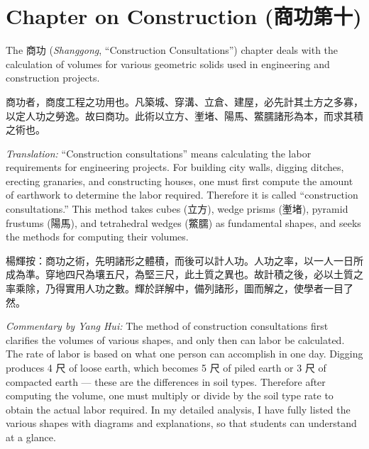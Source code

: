 \documentclass[11pt,a4paper]{article}
\newcommand{\zh}[1]{{#1}}
\newenvironment{chpassage}{%
  \par\medskip
  \begin{center}
  \begin{minipage}{0.95\textwidth}
  \setlength{\parindent}{2em}
  \linespread{1.3}\selectfont
}{%
  \end{minipage}
  \end{center}
  \medskip
}
\begin{document}
\newpage

\section{Chapter on Construction (\zh{商功第十})}
\label{sec:shanggong}

The \zh{商功} (\textit{Shanggong}, ``Construction Consultations'') chapter
deals with the calculation of volumes for various geometric solids used in
engineering and construction projects.

\begin{chpassage}
\zh{商功者，商度工程之功用也。凡築城、穿溝、立倉、建屋，必先計其土方之多寡，以定人功之勞逸。故曰商功。此術以立方、壍堵、陽馬、鱉臑諸形為本，而求其積之術也。}

\medskip
\textit{Translation:} ``Construction consultations'' means calculating the
labor requirements for engineering projects. For building city walls,
digging ditches, erecting granaries, and constructing houses, one must first
compute the amount of earthwork to determine the labor required. Therefore it
is called ``construction consultations.'' This method takes cubes (\zh{立方}),
wedge prisms (\zh{壍堵}), pyramid frustums (\zh{陽馬}), and tetrahedral
wedges (\zh{鱉臑}) as fundamental shapes, and seeks the methods for computing
their volumes.
\end{chpassage}

\begin{chpassage}
\zh{楊輝按：商功之術，先明諸形之體積，而後可以計人功。人功之率，以一人一日所成為準。穿地四尺為壤五尺，為堅三尺，此土質之異也。故計積之後，必以土質之率乘除，乃得實用人功之數。輝於詳解中，備列諸形，圖而解之，使學者一目了然。}

\medskip
\textit{Commentary by Yang Hui:} The method of construction consultations
first clarifies the volumes of various shapes, and only then can labor be
calculated. The rate of labor is based on what one person can accomplish in
one day. Digging produces 4 \zh{尺} of loose earth, which becomes 5 \zh{尺}
of piled earth or 3 \zh{尺} of compacted earth --- these are the
differences in soil types. Therefore after computing the volume, one must
multiply or divide by the soil type rate to obtain the actual labor required.
In my detailed analysis, I have fully listed the various shapes with diagrams
and explanations, so that students can understand at a glance.
\end{chpassage}
\end{document}
